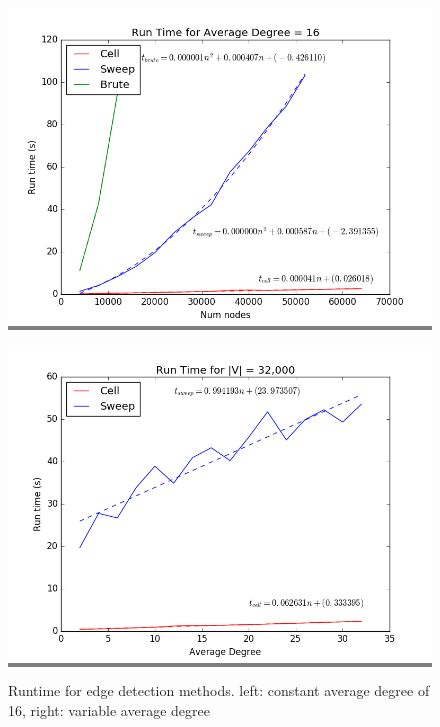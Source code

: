 \documentclass{article}
\begin{document}
\begin{figure}[h]
    \begin{minipage}{0.45\textwidth}
    \colorbox{gray}{\includegraphics[width=\linewidth]{./graphs/run_time_avg_deg_16.png}}
    \end{minipage}
    \hspace{\fill}
    \begin{minipage}{0.45\textwidth}
    \colorbox{gray}{\includegraphics[width=\linewidth]{./graphs/run_time_var_avg_deg.png}}
    \end{minipage}

    \caption{Runtime for edge detection methods. left: constant average degree of 16, right: variable average degree}
    \label{avgdeg}
\end{figure}
\end{document}
